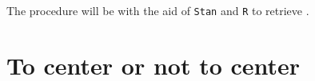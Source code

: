The procedure will be with the aid of \texttt{Stan} \cite{Stan2020} and \texttt{R} \cite{R2015, RStan2020} to retrieve . \\



\section{To center or not to center} \label{sect:noncenter}